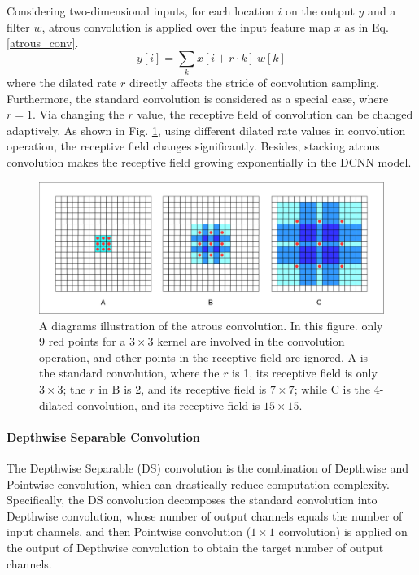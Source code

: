 \documentclass[journal]{IEEEtran}
\begin{document}
Considering two-dimensional inputs, for each location $i$ on the output $y$ and a filter $w$, atrous convolution is applied over the input feature map $x$ as in Eq. \ref{atrous_conv}.
\begin{equation}
    y\left[ i \right] = \sum\limits_{k} x \left[ i+r \cdot k \right]~w\left[ k \right]
    \label{atrous_conv}
\end{equation}
where the dilated rate $r$ directly affects the stride of convolution sampling. Furthermore, the standard convolution is considered as a special case, where $r=1$. Via changing the $r$ value, the receptive field of convolution can be changed adaptively. As shown in Fig. \ref{fg:atrous_conv}, using different dilated rate values in convolution operation, the receptive field changes significantly. Besides, stacking atrous convolution makes the receptive field growing exponentially in the DCNN model. 
\begin{figure}[t]
    \centering
    \includegraphics[width=\columnwidth]{imgs/atrous_conv.png}
    \caption{A diagrams illustration of the atrous convolution. In this figure. only 9 red points for a $3\times 3$ kernel are involved in the convolution operation, and other points in the receptive field are ignored. A is the standard convolution, where the $r$ is 1, its receptive field is only $3\times 3$; the $r$ in B is 2, and its receptive field is $7\times 7$; while C is the 4-dilated convolution, and its receptive field is $15\times 15$.}
    \label{fg:atrous_conv}
\end{figure}

\paragraph{Depthwise Separable Convolution}
The Depthwise Separable (DS) convolution \cite{chollet2017xception} is the combination of Depthwise and Pointwise convolution, which can drastically reduce computation complexity. Specifically, the DS convolution decomposes the standard convolution into Depthwise convolution, whose number of output channels equals the number of input channels, and then Pointwise convolution ($1\times 1$ convolution) is applied on the output of Depthwise convolution to obtain the target number of output channels. 
\end{document}
